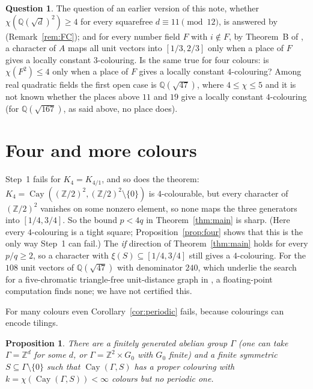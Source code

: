 \documentclass[11pt,a4paper]{amsart}
\newtheorem{proposition}[theorem]{Proposition}
\theoremstyle{definition}
\newtheorem{question}[theorem]{Question}
\newcommand{\Q}{\mathbb{Q}}
\newcommand{\Z}{\mathbb{Z}}
\newcommand{\Cay}{\operatorname{Cay}}
\begin{document}
\begin{question}
The question of an earlier version of this note, whether $\chi(\Q(\sqrt d)^2)\ge4$ for every squarefree
$d\equiv11\pmod{12}$, is answered by \cite{FC} (Remark~\ref{rem:FC}); and for every number field $F$ with $i\notin F$, by Theorem~B of
\cite{TCol}, a character of $A$ maps all unit vectors into $[1/3,2/3]$ only when a place of $F$ gives a locally
constant $3$-colouring. Is the same true for four colours: is $\chi(F^2)\le4$ only when a place of $F$ gives a
locally constant $4$-colouring? Among real quadratic fields the first open case is $\Q(\sqrt{47})$, where
$4\le\chi\le5$ \cite{FC} and it is not known whether the places above $11$ and $19$ give a locally constant
$4$-colouring (for $\Q(\sqrt{167})$, as said above, no place does).
\end{question}

\section{Four and more colours}\label{sec:four}

Step~1 fails for $K_4=K_{4/1}$, and so does the theorem: $K_4=\Cay((\Z/2)^2,(\Z/2)^2\setminus\{0\})$ is
$4$-colourable, but every character of $(\Z/2)^2$ vanishes on some nonzero element, so none maps the three
generators into $[1/4,3/4]$. So the bound $p<4q$ in Theorem~\ref{thm:main} is sharp. (Here every $4$-colouring is
a tight square; Proposition~\ref{prop:four} shows that this is the only way Step~1 can fail.)
The \emph{if} direction of Theorem~\ref{thm:main} holds for every $p/q\ge2$, so a character with
$\xi(S)\subseteq[1/4,3/4]$ still gives a $4$-colouring. For the $108$ unit vectors of $\Q(\sqrt{47})$ with denominator $240$, which underlie the search for
a five-chromatic triangle-free unit-distance graph in \cite{LG}, a floating-point computation finds none; we have
not certified this.

For many colours even Corollary~\ref{cor:periodic} fails, because colourings can encode tilings.

\begin{proposition}\label{prop:aperiodic}
There are a finitely generated abelian group $\Gamma$ (one can take $\Gamma=\Z^d$ for some $d$, or
$\Gamma=\Z^2\times G_0$ with $G_0$ finite) and a finite symmetric $S\subseteq\Gamma\setminus\{0\}$ such that
$\Cay(\Gamma,S)$ has a proper colouring with $k=\chi(\Cay(\Gamma,S))<\infty$ colours but no periodic one.
\end{proposition}
\end{document}
